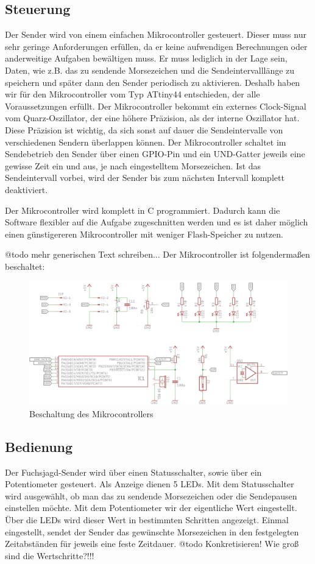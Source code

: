 \subsection{Steuerung}
Der Sender wird von einem einfachen Mikrocontroller gesteuert. Dieser muss nur
sehr geringe Anforderungen erfüllen, da er keine aufwendigen Berechnungen oder anderweitige
Aufgaben bewältigen muss. Er muss lediglich in der Lage sein, Daten, wie z.B. das
zu sendende Morsezeichen und die Sendeintervalllänge zu speichern und später dann
den Sender periodisch zu aktivieren. Deshalb haben wir für den Mikrocontroller vom
Typ ATtiny44 entschieden, der alle Voraussetzungen erfüllt. Der Mikrocontroller bekommt
ein externes Clock-Signal vom Quarz-Oszillator, der eine höhere Präzision, als der interne
Oszillator hat. Diese Präzision ist wichtig, da sich sonst auf dauer die Sendeintervalle von
verschiedenen Sendern überlappen können. Der Mikrocontroller schaltet im Sendebetrieb den Sender
über einen GPIO-Pin und ein UND-Gatter jeweils eine gewisse Zeit ein und aus, je nach eingestelltem
Morsezeichen. Ist das Sendeintervall vorbei, wird der Sender bis zum nächsten Intervall komplett
deaktiviert.

Der Mikrocontroller wird komplett in C programmiert. Dadurch kann die Software flexibler auf die Aufgabe zugeschnitten
werden und es ist daher möglich einen günstigereren Mikrocontroller mit weniger Flash-Speicher zu nutzen.

@todo mehr generischen Text schreiben...
Der Mikrocontroller ist folgendermaßen beschaltet:

\begin{figure}[H]
\includegraphics[scale=0.9]{res/Controller.png}
\caption{Beschaltung des Mikrocontrollers}
\end{figure}

\subsection{Bedienung}
Der Fuchsjagd-Sender wird über einen Statusschalter, sowie über ein Potentiometer
gesteuert. Als Anzeige dienen 5 LEDs. Mit dem Statusschalter wird ausgewählt, ob
man das zu sendende Morsezeichen oder die Sendepausen einstellen möchte.
Mit dem Potentiometer wir der eigentliche Wert eingestellt. Über die LEDs wird dieser
Wert in bestimmten Schritten angezeigt. Einmal eingestellt, sendet der Sender das gewünschte
Morsezeichen in den festgelegten Zeitabständen für jeweils eine feste Zeitdauer.
@todo Konkretisieren! Wie groß sind die Wertschritte?!!!
